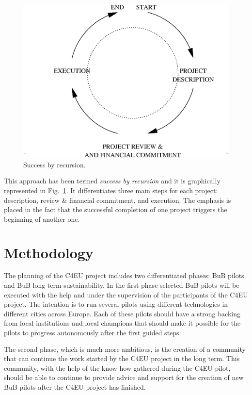 \documentclass[conference]{IEEEtran}
\begin{document}
\begin{figure}[!t]
\centering
\includegraphics[width=\linewidth]{success_wheel}
\caption{Success by recursion.}
\label{fig:success_wheel}
\end{figure}

This approach has been termed \emph{success by recursion} and it is graphically represented in Fig.~\ref{fig:success_wheel}.
It differentiates three main steps for each project: description, review \& financial commitment, and execution.
The emphasis is placed in the fact that the successful completion of one project triggers the beginning of another one.

\section{Methodology}
\label{sec:methodology}

The planning of the C4EU project includes two differentiated phases: BuB pilots and BuB long term sustainability.
In the first phase selected BuB pilots will be executed with the help and under the supervision of the participants of the C4EU project.
The intention is to run several pilots using different technologies in different cities across Europe.
Each of these pilots should have a strong backing from local institutions and local champions that should make it possible for the pilots to progress autonomously after the first guided steps.

The second phase, which is much more ambitious, is the creation of a community that can continue the work started by the C4EU project in the long term.
This community, with the help of the know-how gathered during the C4EU pilot, should be able to continue to provide advice and support for the creation of new BuB pilots after the C4EU project has finished.
\end{document}
